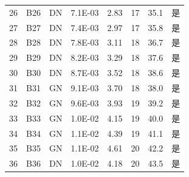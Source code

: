 {\begin{longtable}{cccccccc}
26&B26&DN&7.1E-03&2.83&17&35.1&是\\
27&B27&DN&7.4E-03&2.97&17&35.8&是\\
28&B28&DN&7.8E-03&3.11&18&36.7&是\\
29&B29&DN&8.2E-03&3.29&18&37.6&是\\
30&B30&DN&8.7E-03&3.52&18&38.6&是\\
31&B31&GN&9.1E-03&3.70&18&38.0&是\\
32&B32&GN&9.6E-03&3.93&19&39.2&是\\
33&B33&GN&1.0E-02&4.15&19&40.0&是\\
34&B34&GN&1.1E-02&4.39&19&41.1&是\\
35&B35&GN&1.1E-02&4.61&20&42.2&是\\
36&B36&DN&1.0E-02&4.18&20&43.5&是\\
\end{longtable}
}
